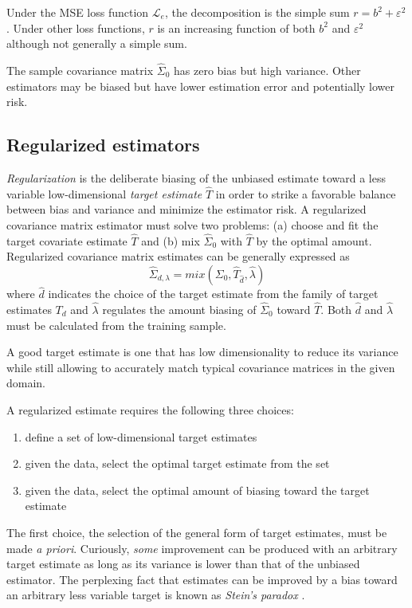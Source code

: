 Under the MSE loss function $\mathcal L_e$, the decomposition is the simple sum $r = b^2 + \varepsilon^2$. 
Under other loss functions, $r$ is an increasing function of both $b^2$ and $\varepsilon^2$ although not generally a simple sum.  

The sample covariance matrix $\hat\Sigma_0$ has zero bias but high variance. Other estimators may be biased but have lower estimation error and potentially lower risk.


\subsection{Regularized estimators}

\emph{Regularization} is the deliberate biasing of the unbiased estimate toward a less variable low-dimensional \emph{target estimate} $\hat T$ in order to strike a favorable balance between bias and variance and minimize the estimator risk.  A regularized covariance matrix estimator must solve two problems: (a) choose and fit the target covariate estimate $\hat T$ and (b) mix $\hat\Sigma_0$ with $\hat T$ by the optimal amount. Regularized covariance matrix estimates can be generally expressed as 
\begin{equation}
\hat\Sigma_{d,\lambda} = mix(\Sigma_0,\hat T_{\hat d},\hat\lambda) 
\end{equation}
where $\hat d$ indicates the choice of the target estimate from the family of target estimates $T_d$ and $\hat \lambda$ regulates the amount biasing of $\hat\Sigma_0$ toward $\hat T$.
Both $\hat d$ and $\hat \lambda$ must be calculated from the training sample. 

A good target estimate is one that has low dimensionality to reduce its variance while still allowing to accurately match typical covariance matrices in the given domain. 

A regularized estimate requires the following three choices: 
\begin{enumerate}[  1. ]
\item define a set of low-dimensional target estimates
\item given the data, select the optimal target estimate from the set 
\item given the data, select the optimal amount of biasing toward the target estimate
\end{enumerate}
The first choice, the selection of the general form of target estimates, must be made \emph{a priori}.  Curiously, \emph{some} improvement can be produced with an arbitrary target estimate as long as its variance is lower than that of the unbiased estimator.  The perplexing fact that estimates can be improved by a bias toward an arbitrary less variable target is known as \emph{Stein's paradox} \citep{Efron:1977}.  

